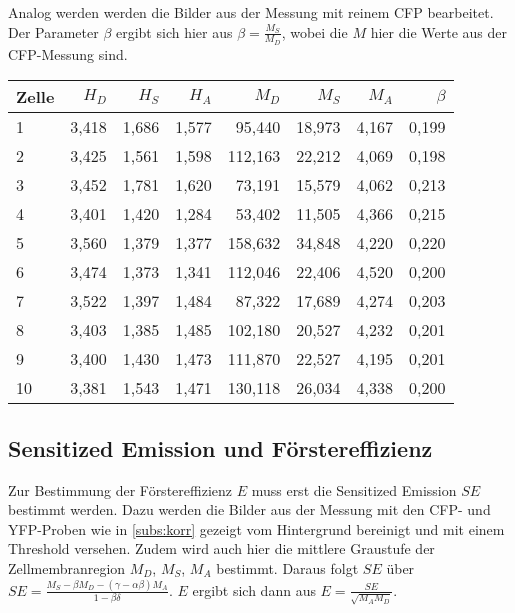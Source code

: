 Analog werden werden die Bilder aus der Messung mit reinem CFP bearbeitet. Der Parameter $\beta$ ergibt sich hier aus 
$\beta = \frac{M_S}{M_D}$, wobei die $M$ hier die Werte aus der CFP-Messung sind.


\begin{center}
    \centering
    \begin{tabular}{lrrrrrrr}
        \toprule
        Zelle &  $H_D$ &  $H_S$ &  $H_A$ &    $M_D$ &   $M_S$ &  $M_A$ &  $\beta$ \\
        \midrule
        1     & 3,418 & 1,686 & 1,577 &  95,440 & 18,973 & 4,167 & 0,199 \\
        2     & 3,425 & 1,561 & 1,598 & 112,163 & 22,212 & 4,069 & 0,198 \\
        3     & 3,452 & 1,781 & 1,620 &  73,191 & 15,579 & 4,062 & 0,213 \\
        4     & 3,401 & 1,420 & 1,284 &  53,402 & 11,505 & 4,366 & 0,215 \\
        5     & 3,560 & 1,379 & 1,377 & 158,632 & 34,848 & 4,220 & 0,220 \\
        6     & 3,474 & 1,373 & 1,341 & 112,046 & 22,406 & 4,520 & 0,200 \\
        7     & 3,522 & 1,397 & 1,484 &  87,322 & 17,689 & 4,274 & 0,203 \\
        8     & 3,403 & 1,385 & 1,485 & 102,180 & 20,527 & 4,232 & 0,201 \\
        9     & 3,400 & 1,430 & 1,473 & 111,870 & 22,527 & 4,195 & 0,201 \\
        10    & 3,381 & 1,543 & 1,471 & 130,118 & 26,034 & 4,338 & 0,200 \\
        \bottomrule
    \end{tabular}
    \label{tab:CFP}
\end{center}

\subsection{Sensitized Emission und Förstereffizienz}
Zur Bestimmung der Förstereffizienz $E$ muss erst die Sensitized Emission $SE$ bestimmt werden. Dazu werden die Bilder aus der 
Messung mit den CFP- und YFP-Proben wie in \ref{subs:korr} gezeigt vom Hintergrund bereinigt und mit einem Threshold versehen. 
Zudem wird auch hier die mittlere Graustufe der Zellmembranregion $M_D$, $M_S$, $M_A$ bestimmt. Daraus folgt $SE$ über 
$SE = \frac{M_S - \beta M_D - (\gamma - \alpha \beta) M_A}{1 - \beta \delta}$. $E$ ergibt sich dann aus 
$E = \frac{SE}{\sqrt{M_A M_D}}$.


